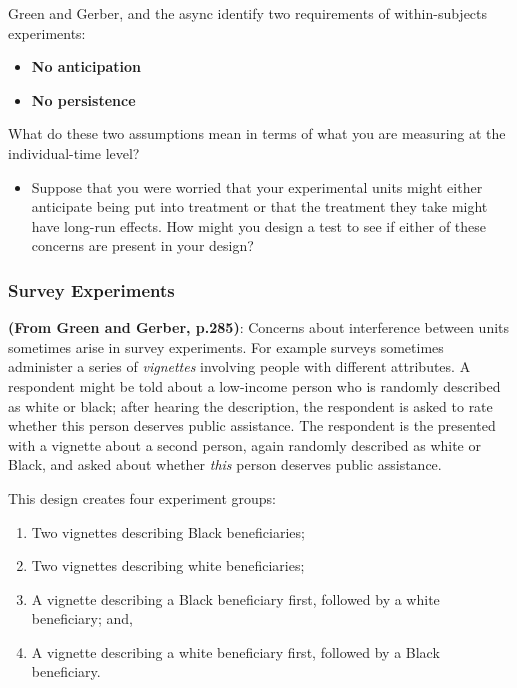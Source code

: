 \documentclass[
]{article}
\providecommand{\tightlist}{%
  \setlength{\itemsep}{0pt}\setlength{\parskip}{0pt}}
\begin{document}
Green and Gerber, and the async identify two requirements of within-subjects experiments:

\begin{itemize}
\tightlist
\item
  \textbf{No anticipation}
\item
  \textbf{No persistence}
\end{itemize}

What do these two assumptions mean in terms of what you are measuring at the individual-time level?

\begin{itemize}
\tightlist
\item
  Suppose that you were worried that your experimental units might either anticipate being put into treatment or that the treatment they take might have long-run effects. How might you design a test to see if either of these concerns are present in your design?
\end{itemize}

\hypertarget{survey-experiments}{%
\subsubsection{Survey Experiments}\label{survey-experiments}}

\textbf{(From Green and Gerber, p.285)}: Concerns about interference between units sometimes arise in survey experiments. For example surveys sometimes administer a series of \emph{vignettes} involving people with different attributes. A respondent might be told about a low-income person who is randomly described as white or black; after hearing the description, the respondent is asked to rate whether this person deserves public assistance. The respondent is the presented with a vignette about a second person, again randomly described as white or Black, and asked about whether \emph{this} person deserves public assistance.

This design creates four experiment groups:

\begin{enumerate}
\def\labelenumi{\arabic{enumi}.}
\tightlist
\item
  Two vignettes describing Black beneficiaries;
\item
  Two vignettes describing white beneficiaries;
\item
  A vignette describing a Black beneficiary first, followed by a white beneficiary; and,
\item
  A vignette describing a white beneficiary first, followed by a Black beneficiary.
\end{enumerate}
\end{document}
